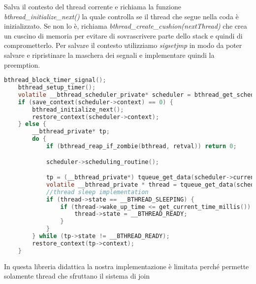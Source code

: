 \documentclass{article}
\begin{document}
\noindent  Salva il contesto del thread corrente e richiama la funzione \textit{bthread\_initialize\_next()} la quale controlla se il thread che segue nella coda è inizializzato. Se non lo è, richiama \textit{ bthread\_create\_cushion(nextThread)} che crea un cuscino di memoria per evitare di sovrascrivere 
parte dello stack e quindi di comprometterlo. Per salvare il contesto utilizziamo \textit{sigsetjmp} in modo da poter salvare e ripristinare la maschera dei segnali e implementare quindi la preemption.

\begin{lstlisting}[language=C]
bthread_block_timer_signal();
    bthread_setup_timer();
    volatile __bthread_scheduler_private* scheduler = bthread_get_scheduler();
    if (save_context(scheduler->context) == 0) {
        bthread_initialize_next();
        restore_context(scheduler->context);
    } else {
        __bthread_private* tp;
        do {
            if (bthread_reap_if_zombie(bthread, retval)) return 0;

            scheduler->scheduling_routine();

            tp = (__bthread_private*) tqueue_get_data(scheduler->current_item);
            volatile __bthread_private * thread = tqueue_get_data(scheduler->current_item);
            //thread sleep implementation
            if (thread->state == __BTHREAD_SLEEPING) {
                if (thread->wake_up_time <= get_current_time_millis()) {
                    thread->state = __BTHREAD_READY;
                }
            }
        } while (tp->state != __BTHREAD_READY);
        restore_context(tp->context);
    }
\end{lstlisting}

In questa libreria didattica la nostra implementazione è limitata perché permette solamente thread che sfruttano il sistema di join

\end{document}
